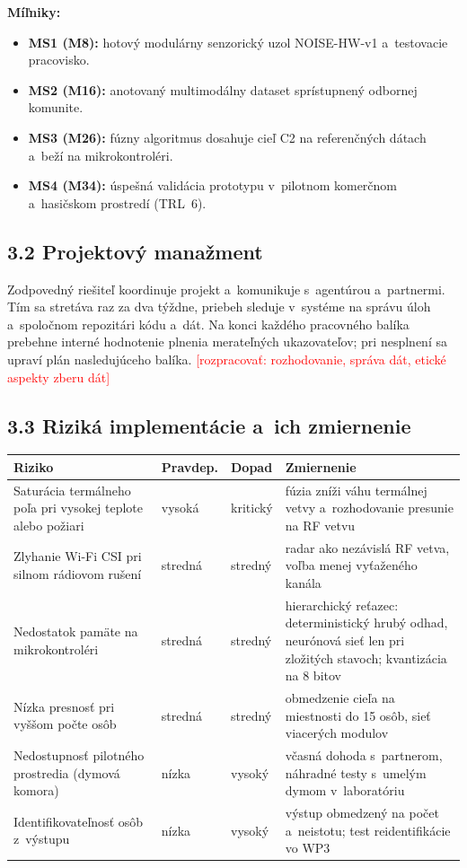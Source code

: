 \documentclass[11pt,a4paper]{article}
\newcommand{\doplnit}[1]{\textcolor{red}{[#1]}}
\begin{document}
\textbf{Míľniky:}
\begin{itemize}
\item \textbf{MS1 (M8):} hotový modulárny senzorický uzol NOISE-HW-v1 a~testovacie pracovisko.
\item \textbf{MS2 (M16):} anotovaný multimodálny dataset sprístupnený odbornej komunite.
\item \textbf{MS3 (M26):} fúzny algoritmus dosahuje cieľ C2 na referenčných dátach a~beží na mikrokontroléri.
\item \textbf{MS4 (M34):} úspešná validácia prototypu v~pilotnom komerčnom a~hasičskom prostredí (TRL~6).
\end{itemize}

\subsection*{3.2 Projektový manažment}
Zodpovedný riešiteľ koordinuje projekt a~komunikuje s~agentúrou a~partnermi. Tím sa stretáva raz za dva týždne, priebeh sleduje v~systéme na správu úloh a~spoločnom repozitári kódu a~dát. Na konci každého pracovného balíka prebehne interné hodnotenie plnenia merateľných ukazovateľov; pri nesplnení sa upraví plán nasledujúceho balíka. \doplnit{rozpracovať: rozhodovanie, správa dát, etické aspekty zberu dát}

\subsection*{3.3 Riziká implementácie a~ich zmiernenie}

\begin{center}
\small
\begin{tabularx}{\textwidth}{|L|p{1.7cm}|p{1.5cm}|L|}
\hline
{}\textbf{Riziko} & \textbf{Pravdep.} & \textbf{Dopad} & \textbf{Zmiernenie} \\ \hline
Saturácia termálneho poľa pri vysokej teplote alebo požiari & vysoká & kritický & fúzia zníži váhu termálnej vetvy a~rozhodovanie presunie na RF vetvu \\ \hline
Zlyhanie Wi-Fi CSI pri silnom rádiovom rušení & stredná & stredný & radar ako nezávislá RF vetva, voľba menej vyťaženého kanála \\ \hline
Nedostatok pamäte na mikrokontroléri & stredná & stredný & hierarchický reťazec: deterministický hrubý odhad, neurónová sieť len pri zložitých stavoch; kvantizácia na 8 bitov \\ \hline
Nízka presnosť pri vyššom počte osôb & stredná & stredný & obmedzenie cieľa na miestnosti do 15 osôb, sieť viacerých modulov \\ \hline
Nedostupnosť pilotného prostredia (dymová komora) & nízka & vysoký & včasná dohoda s~partnerom, náhradné testy s~umelým dymom v~laboratóriu \\ \hline
Identifikovateľnosť osôb z~výstupu & nízka & vysoký & výstup obmedzený na počet a~neistotu; test reidentifikácie vo WP3 \\ \hline
\end{tabularx}
\end{center}
\end{document}
